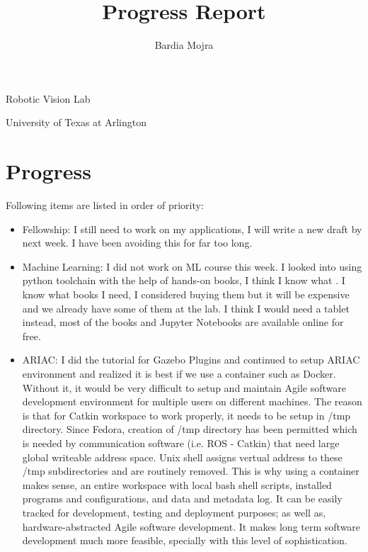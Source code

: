 \documentclass[11pt]{article}
\title{Progress Report}
\author{Bardia Mojra}
\begin{document}
	\maketitle
	\thispagestyle{empty}

\begin{center}
\bigskip
\bigskip
Robotic Vision Lab
 
University of Texas at Arlington
\end{center}

\newpage 

\section{Progress}
Following items are listed in order of priority: 
\begin{itemize}  

  	\item Fellowship: I still need to work on my applications, I will write a new draft by next week. I have been avoiding this for far too long. 
  	
  	\item Machine Learning: I did not work on ML course this week. I looked into using python toolchain with the help of hands-on books, I think I know what . I know what books I need, I considered buying them but it will be expensive and we already have some of them at the lab.  I think I would need a tablet instead, most of the books and Jupyter Notebooks are available online for free. 
  	
  	\item ARIAC: I did the tutorial for Gazebo Plugins and continued to setup ARIAC environment and realized it is best if we use a container such as Docker. Without it, it would be very difficult to setup and maintain Agile software development environment for multiple users on different machines. The reason is that for Catkin workspace to work properly, it needs to be setup in /tmp directory. Since Fedora, creation of /tmp directory has been permitted which is needed by communication software (i.e. ROS - Catkin) that need large global writeable address space. Unix shell assigns vertual address to these /tmp subdirectories and are routinely removed. This is why using a container makes sense, an entire workspace with local bash shell scripts, installed programs and configurations, and data and metadata log. It can be easily tracked for development, testing and deployment purposes; as well as, hardware-abstracted Agile software development. It makes long term software development much more feasible, specially with this level of sophistication.
    

\end{itemize}
\end{document}

